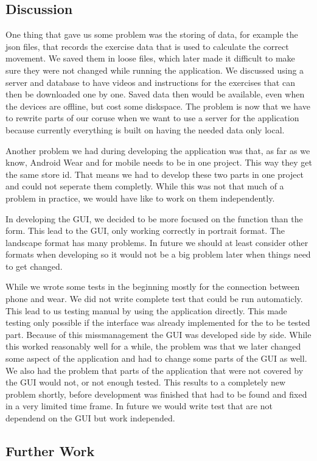 \subsection{Discussion}
One thing that gave us some problem was the storing of data, for example the json files, that records the exercise data that is used to calculate the correct movement. We saved them in loose files, which later made it difficult to make sure they were not changed while running the application. We discussed using a server and database to have videos and instructions for the exercises that can then be downloaded one by one. Saved data then would be available, even when the devices are offline, but cost some diskspace. The problem is now that we have to rewrite parts of our coruse when we want to use a server for the application because currently everything is built on having the needed data only local.

Another problem we had during developing the application was that, as far as we know, Android Wear and for mobile needs to be in one project. This way they get the same store id. That means we had to develop these two parts in one project and could not seperate them completly. While this was not that much of a problem in practice, we would have like to work on them independently.

In developing the GUI, we decided to be more focused on the function than the form. This lead to the GUI, only working correctly in portrait format. The landscape format has many problems. In future we should at least consider other formats when developing so it would not be a big problem later when things need to get changed.


While we wrote some tests in the beginning mostly for the connection between phone and wear. We did not write complete test that could be run automaticly. This lead to us testing manual by using the application directly. This made testing only possible if the interface was already implemented for the to be tested part.
Because of this missmanagement the GUI was developed side by side. While this worked reasonably well for a while, the problem was that we later changed some aspect of the application and had to change some parts of the GUI as well.
We also had the problem that parts of the application that were not covered by the GUI would not, or not enough tested. This results to a completely new problem shortly, before development was finished that had to be found and fixed in a very limited time frame.
In future we would write test that are not dependend on the GUI but work independed.
\subsection{Further Work}
